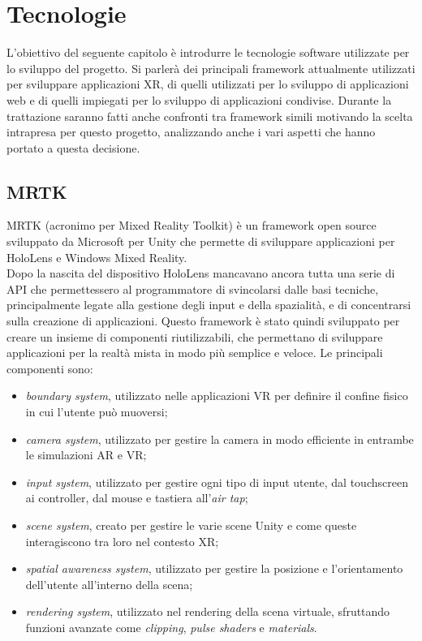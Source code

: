\chapter{Tecnologie}\label{chap:Tecnologie}
L'obiettivo del seguente capitolo è introdurre le tecnologie software utilizzate per lo sviluppo del progetto. Si parlerà dei principali framework attualmente utilizzati per sviluppare
applicazioni XR, di quelli utilizzati per lo sviluppo di applicazioni web e di quelli impiegati per lo sviluppo di applicazioni condivise. Durante la trattazione saranno fatti anche
confronti tra framework simili motivando la scelta intrapresa per questo progetto, analizzando anche i vari aspetti che hanno portato a questa decisione.

\section{MRTK}\label{sec:MRTK}
MRTK (acronimo per Mixed Reality Toolkit) è un framework open source sviluppato da Microsoft per Unity che permette di sviluppare applicazioni per HoloLens e Windows Mixed Reality\cite{MRTK}.\\
Dopo la nascita del dispositivo HoloLens mancavano ancora tutta una serie di API che permettessero al programmatore di svincolarsi dalle basi tecniche, principalmente legate 
alla gestione degli input e della spazialità, e di concentrarsi sulla creazione di applicazioni.
Questo framework è stato quindi sviluppato per creare un insieme di componenti riutilizzabili, che permettano di sviluppare applicazioni per la realtà mista in modo più semplice e 
veloce. Le principali componenti sono:
\begin{itemize}
    \item \textit{boundary system}, utilizzato nelle applicazioni VR per definire il confine fisico in cui l'utente può muoversi;
    \item \textit{camera system}, utilizzato per gestire la camera in modo efficiente in entrambe le simulazioni AR e VR;
    \item \textit{input system}, utilizzato per gestire ogni tipo di input utente, dal touchscreen ai controller, dal mouse e tastiera all'\textit{air tap};
    \item \textit{scene system}, creato per gestire le varie scene Unity e come queste interagiscono tra loro nel contesto XR;
    \item \textit{spatial awareness system}, utilizzato per gestire la posizione e l'orientamento dell'utente all'interno della scena;
    \item \textit{rendering system}, utilizzato nel rendering della scena virtuale, sfruttando funzioni avanzate come \textit{clipping}, \textit{pulse shaders} e \textit{materials}.
\end{itemize}
